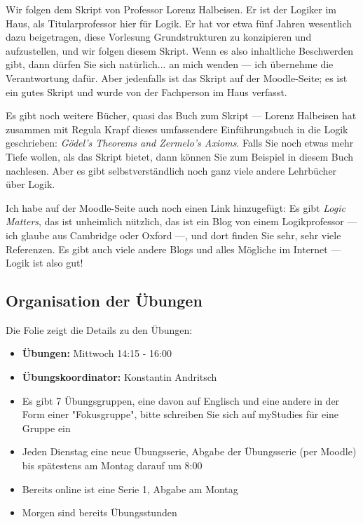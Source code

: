\begin{spoken-clean}[00:04:00 - 00:05:27]
Wir folgen dem Skript von Professor Lorenz Halbeisen. Er ist der Logiker im Haus, als Titularprofessor hier für Logik. Er hat vor etwa fünf Jahren wesentlich dazu beigetragen, diese Vorlesung Grundstrukturen zu konzipieren und aufzustellen, und wir folgen diesem Skript. Wenn es also inhaltliche Beschwerden gibt, dann dürfen Sie sich natürlich... an mich wenden --- ich übernehme die Verantwortung dafür. Aber jedenfalls ist das Skript auf der Moodle-Seite; es ist ein gutes Skript und wurde von der Fachperson im Haus verfasst.

Es gibt noch weitere Bücher, quasi das Buch zum Skript --- Lorenz Halbeisen hat zusammen mit Regula Krapf dieses umfassendere Einführungsbuch in die Logik geschrieben: \emph{Gödel's Theorems and Zermelo's Axioms}. Falls Sie noch etwas mehr Tiefe wollen, als das Skript bietet, dann können Sie zum Beispiel in diesem Buch nachlesen. Aber es gibt selbstverständlich noch ganz viele andere Lehrbücher über Logik.

Ich habe auf der Moodle-Seite auch noch einen Link hinzugefügt: Es gibt \emph{Logic Matters}, das ist unheimlich nützlich, das ist ein Blog von einem Logikprofessor --- ich glaube aus Cambridge oder Oxford ---, und dort finden Sie sehr, sehr viele Referenzen. Es gibt auch viele andere Blogs und alles Mögliche im Internet --- Logik ist also gut!
\end{spoken-clean}

\begin{ai-global-state-checkpoint-invisible-content}
\end{ai-global-state-checkpoint-invisible-content}

\subsection{Organisation der Übungen}

\begin{meta-note}
Die Folie zeigt die Details zu den Übungen:
\begin{itemize}
    \item \textbf{Übungen:} Mittwoch 14:15 - 16:00
    \item \textbf{Übungskoordinator:} Konstantin Andritsch
    \item Es gibt 7 Übungsgruppen, eine davon auf Englisch und eine andere in der Form einer "Fokusgruppe", bitte schreiben Sie sich auf myStudies für eine Gruppe ein
    \item Jeden Dienstag eine neue Übungsserie, Abgabe der Übungsserie (per Moodle) bis spätestens am Montag darauf um 8:00
    \item Bereits online ist eine Serie 1, Abgabe am Montag
    \item Morgen sind bereits Übungsstunden
\end{itemize}
\end{meta-note}

